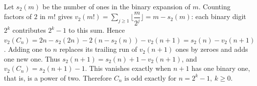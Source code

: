 Let $s_2(m)$ be the number of ones in the binary expansion of $m$. Counting factors of $2$ in $m!$ gives $v_2(m!)=\sum_{j\ge1}\lfloor\dfrac{m}{2^j}\rfloor=m-s_2(m)$: each binary digit $2^k$ contributes $2^k-1$ to this sum. Hence $v_2(C_n)=2n-s_2(2n)-2(n-s_2(n))-v_2(n+1)=s_2(n)-v_2(n+1)$. Adding one to $n$ replaces its trailing run of $v_2(n+1)$ ones by zeroes and adds one new one. Thus $s_2(n+1)=s_2(n)+1-v_2(n+1)$, and $v_2(C_n)=s_2(n+1)-1$. This vanishes exactly when $n+1$ has one binary one, that is, is a power of two. Therefore $\boxed{C_n\text{ is odd exactly for }n=2^k-1,\ k\ge0}$.
